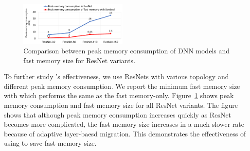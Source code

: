 \begin{figure}[!t]
\centering
\includegraphics[width=0.48\textwidth,height=0.38\linewidth]{figures/resnet_diff_input.pdf}
\vspace{-20pt}
\caption{Comparison between peak memory consumption of DNN models and fast memory size for ResNet variants.}
\vspace{-15pt}
\label{fig:mem_consumption}
\end{figure}


To further study \name's effectiveness, we use ResNets with various topology and different peak memory consumption. We report the minimum fast memory size with which \name performs the same as the fast memory-only. %
Figure~\ref{fig:mem_consumption} shows peak memory consumption and fast memory size for all ResNet variants. The figure shows that although peak memory consumption increases quickly as ResNet becomes more complicated, the fast memory size increases in a much slower rate because of adaptive layer-baesd migration.  
This demonstrates the effectiveness of using \name to save fast memory size.
\vspace{-10pt}

